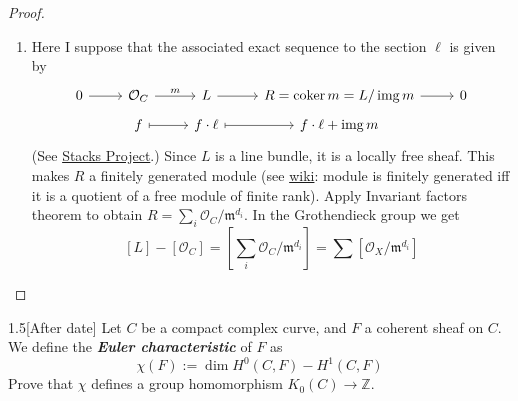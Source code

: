 \begin{proof}\leavevmode
	\begin{enumerate}[label=\alph*.]
		\item Here I suppose that the associated exact sequence to the section $\ell$ is given by
			\[\begin{tikzcd}[row sep=tiny]
				0\arrow[r]&\mathcal{O}_C\arrow[r,"m"]&L\arrow[r]&R=\operatorname{coker} m=L/\operatorname{img} m\arrow[r]&0\\
				& f\arrow[r,maps to]& f\cdot \ell\arrow[r,maps to]&f\cdot \ell+\operatorname{img} m
			\end{tikzcd}\]
			(See \href{https://stacks.math.columbia.edu/tag/01AL}{Stacks Project}.) Since  $L$ is a line bundle, it is a locally free sheaf. This makes $R$ a finitely generated module (see \href{https://en.wikipedia.org/wiki/Finitely_generated_module}{wiki}: module is finitely generated iff it is a quotient of a free module of finite rank). Apply Invariant factors theorem to obtain  $R=\sum_{i}\mathcal{O}_C/\mathfrak{m}^{d_i}$. In the Grothendieck group we get
			\[ [L]-[\mathcal{O}_C]=\left[\sum_{i}\mathcal{O}_C/\mathfrak{m}^{d_i}\right]= \sum [\mathcal{O}_X/\mathfrak{m}^{d_i}]\]
	\end{enumerate}
\end{proof}

\begin{manualexercise}{1.5}[After date]
	Let $C$ be a compact complex curve, and $F$ a coherent sheaf on  $C$. We define the \textit{\textbf{Euler characteristic}} of $F$ as
	\[\chi(F):=\dim H^{0}(C,F)-H^{1}(C,F)\]
	Prove that $\chi$ defines a group homomorphism $K_0(C)\to \mathbb{Z}$.
\end{manualexercise}

